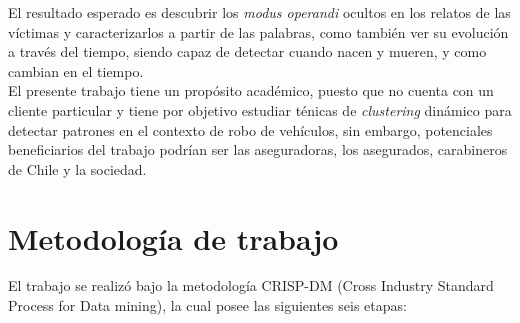 \documentclass[letterpaper,12pt,oneside]{book} %
\begin{document}
El resultado esperado es descubrir los \textit{modus operandi} ocultos en los relatos de las víctimas y caracterizarlos a partir de las palabras, como también ver su evolución a través del tiempo, siendo capaz de detectar cuando nacen y mueren, y como cambian en el tiempo.\\

El presente trabajo tiene un propósito académico, puesto que no cuenta con un cliente particular y tiene por objetivo estudiar ténicas de \textit{clustering} dinámico para detectar patrones en el contexto de robo de vehículos, sin embargo, potenciales beneficiarios del trabajo podrían ser las aseguradoras, los asegurados, carabineros de Chile y la sociedad.

\section{Metodología de trabajo}
El trabajo se realizó bajo la metodología CRISP-DM (Cross Industry Standard Process for Data mining)\citep{chapman2000crisp}, la cual posee las siguientes seis etapas:
\end{document}
